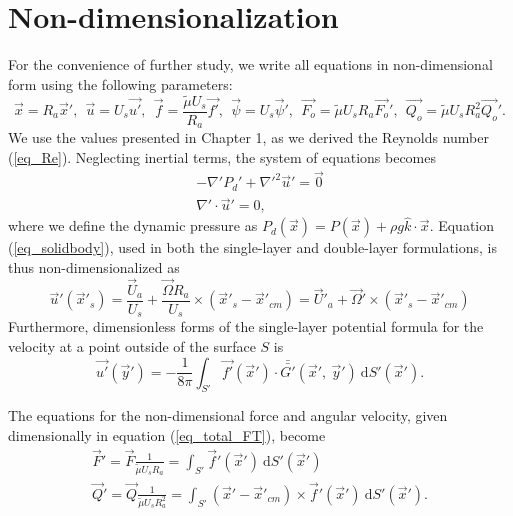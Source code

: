 \section{Non-dimensionalization}
\label{section3}
For the convenience of further study, we write all equations in non-dimensional form using the following parameters:
\begin{equation}
\vec{x} = R_a\vec{x}', 
\ \
 \vec{u} = U_s \vec{u'},
 \ \ 
  \vec{f} = \frac{\tilde{\mu} U_s}{R_a} \vec{f'},
  \ \ 
  \vec{\psi} = U_s \vec{\psi}',
  \ \ 
  \vec{F_o} = \tilde{\mu} U_s R_a \vec{F_o}',
  \ \
  \vec{Q_o} = \tilde{\mu} U_s R_a^2 \vec{Q_o}'.
\label{eq_nonD}
\end{equation}
We use the values presented in Chapter 1, as we derived the Reynolds number (\ref{eq_Re}). 
Neglecting inertial terms, the system of equations becomes
\begin{align}
    -\nabla' P_d' +  \nabla'^2 \vec{u}'  = \vec{0}
	\label{eq_momentum_noD}
	\\
    \nabla' \cdot \vec{u}' = 0,
	\label{eq_conti_noD}
\end{align}
where we define the dynamic pressure as 
$P_d(\vec{x}) =  P(\vec{x}) + \rho g \hat{k} \cdot \vec{x}$.
Equation (\ref{eq_solidbody}), used in both the single-layer and double-layer formulations, is thus non-dimensionalized as 
\begin{equation}
  \vec{u}'(\vec{x}'_s) = \frac{\vec{U}_a}{U_s} +  \frac{\vec{\Omega}R_a}{U_s} \times (\vec{x}'_s - \vec{x}'_{cm}) = \vec{U}'_a +  \vec{\Omega}' \times (\vec{x}'_s - \vec{x}'_{cm})
  \label{eq_solidbody_nonD}
\end{equation}
Furthermore, dimensionless forms of the single-layer potential formula for the velocity at a point outside of the surface $S$ is 
\begin{equation}
    \vec{u'}(\vec{y}') =
	- \frac{1}{8 \pi}
	\int_{S'}  \vec{f'}(\vec{x}') \cdot \bar{\bar{G'}}(\vec{x}', \ \vec{y}') \ \text{d}S'(\vec{x}').
    \label{eq_BI_sl_ND}
\end{equation}
\par
The equations for the non-dimensional force and angular velocity, given dimensionally in equation (\ref{eq_total_FT}), become
\begin{align}
\vec{F}' =  \vec{F} \frac{1}{\tilde{\mu} U_s R_a}  =  \int_{S'} \vec{f}'(\vec{x}') \  \text{d}S'(\vec{x}')  
\label{eq_forcebal} 
\\  
 \vec{Q}' = \vec{Q} \frac{1}{\tilde{\mu} U_s R_a^2} =  \int_{S'} (\vec{x}' - \vec{x}'_{cm}) \times \vec{f}'(\vec{x}')  \ \text{d}S'(\vec{x}').  \label{eq_torquebal} 
\end{align}
